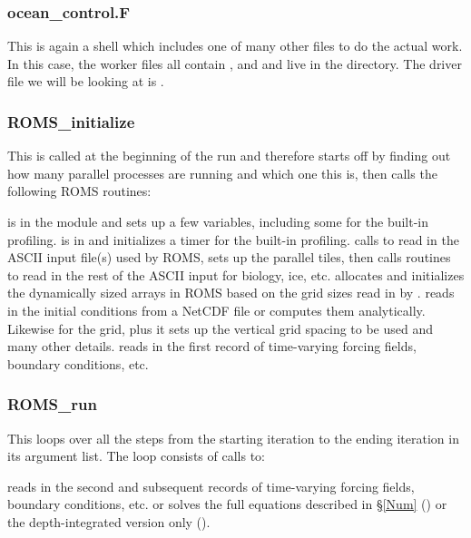 \subsubsection{ocean\_control.F}
This is again a shell which includes one of many other files to do
the actual work. In this case, the worker files all contain
,  and 
and live in the  directory. The driver file we
will be looking at is .

\subsubsection{ROMS\_initialize}
This is called at the beginning of the run and therefore starts off
by finding out how many parallel processes are running and which one
this is, then calls the following ROMS routines:
\begin{klist}
   is in the  module and
  sets up a few variables, including some for the built-in profiling.
   is in  and initializes a timer for
  the built-in profiling.
   calls  to read in the ASCII input
  file(s) used by ROMS, sets up the parallel tiles, then calls
  routines to read in the rest of the ASCII input for biology, ice,
  etc.
   allocates and initializes the dynamically sized
  arrays in ROMS based on the grid sizes read in by .
   reads in the initial conditions from a NetCDF file or
  computes them analytically. Likewise for the grid, plus it sets up the
  vertical grid spacing to be used and many other details.
   reads in the first record of time-varying forcing
  fields, boundary conditions, etc.
\end{klist}

\subsubsection{ROMS\_run}
This loops over all the steps from the starting iteration to the ending
iteration in its argument list. The loop consists of calls to:
\begin{klist}
   reads in the second and subsequent records of
  time-varying forcing fields, boundary conditions, etc.
   or  solves the full
  equations described in \S\ref{Num} () or the depth-integrated
  version only ().
\end{klist}

